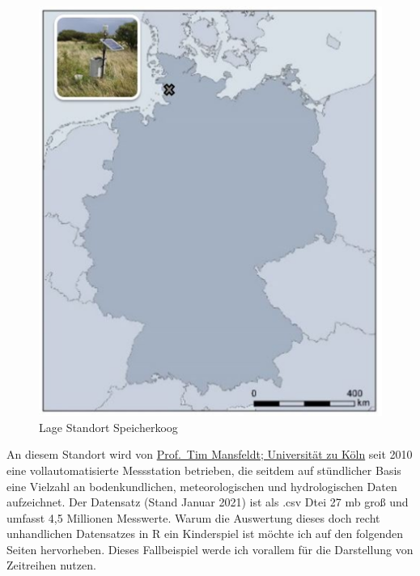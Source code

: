 \documentclass[
]{article}
\begin{document}
\begin{figure}

{\centering \includegraphics[width=6.53in]{images/002} 

}

\caption{Lage Standort Speicherkoog}\label{fig:unnamed-chunk-4}
\end{figure}

An diesem Standort wird von \href{https://geographie.uni-koeln.de/forschung/arbeitsgruppen/bodengeographie-bodenkunde}{Prof.~Tim Mansfeldt; Universität zu Köln} seit 2010 eine vollautomatisierte Messstation betrieben, die seitdem auf stündlicher Basis eine Vielzahl an bodenkundlichen, meteorologischen und hydrologischen Daten aufzeichnet. Der Datensatz (Stand Januar 2021) ist als .csv Dtei 27 mb groß und umfasst 4,5 Millionen Messwerte. Warum die Auswertung dieses doch recht unhandlichen Datensatzes in R ein Kinderspiel ist möchte ich auf den folgenden Seiten hervorheben. Dieses Fallbeispiel werde ich vorallem für die Darstellung von Zeitreihen nutzen.
\end{document}
